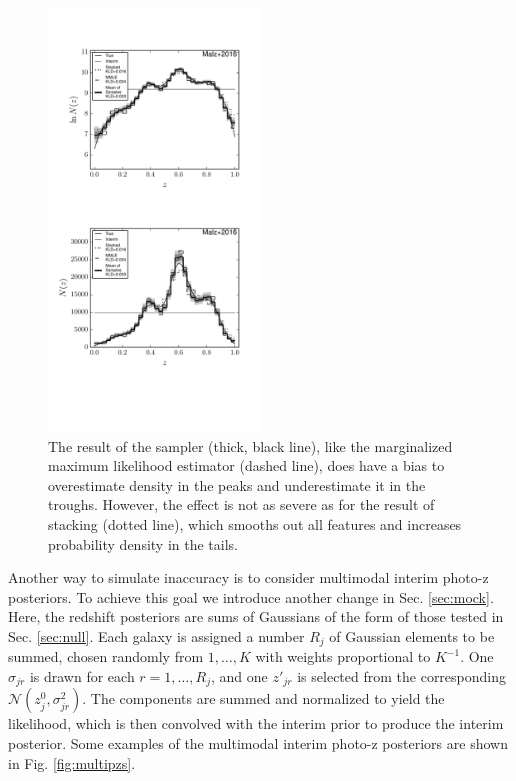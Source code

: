 \documentclass[preprint]{aastex}
\begin{document}
\begin{figure}
\includegraphics[width=0.5\textwidth]{figs/vars/comps.pdf}
\caption{The result of the sampler (thick, black line), like the marginalized 
maximum likelihood estimator (dashed line), does have a bias to overestimate 
density in the peaks and underestimate it in the troughs.  However, the effect 
is not as severe as for the result of stacking (dotted line), which smooths out 
all features and increases probability density in the tails.}
\label{fig:noisy-comp}
\end{figure}

Another way to simulate inaccuracy is to consider multimodal interim photo-z 
posteriors.  To achieve this goal we introduce another change in Sec. 
\ref{sec:mock}.  Here, the redshift posteriors are sums of Gaussians of the 
form of those tested in Sec. \ref{sec:null}.  Each galaxy is assigned a number 
$R_{j}$ of Gaussian elements to be summed, chosen randomly from $1,\dots,K$ 
with weights proportional to $K^{-1}$.  One $\sigma_{jr}$ is drawn for each 
$r=1,\dots,R_{j}$, and one $z'_{jr}$ is selected from the corresponding 
$\mathcal{N}(z^{0}_{j},\sigma^{2}_{jr})$.  The components are summed and 
normalized to yield the likelihood, which is then convolved with the interim 
prior to produce the interim posterior.  Some examples of the multimodal 
interim photo-z posteriors are shown in Fig. \ref{fig:multipzs}.  
\end{document}
